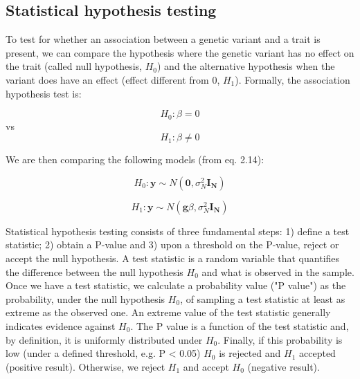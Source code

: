 
\newpage

\subsection{Statistical hypothesis testing}

To test for whether an association between a genetic variant and a trait is present, we can compare the hypothesis where the genetic variant has no effect on the trait (called null hypothesis, $H_0$) and the alternative hypothesis when the variant does have an effect (effect different from 0, $H_1$).
Formally, the association hypothesis test is:

\begin{equation}\label{eq14:null_hypothesis}
 H_{0}: \beta=0 
\end{equation}
vs
\begin{equation}\label{eq15:alternative_hypothesis}
 H_{1}: \beta \neq 0 
\end{equation}

We are then comparing the following models (from eq. 2.14):

\begin{equation}\label{eq16:null_hypothesis_regression}
 H_0: \mathbf{y} \sim N(\mathbf{0}, \sigma_N^{2} \mathbf{I_N}) 
\end{equation}

\begin{equation}\label{eq17:alternative_hypothesis_regression}
 H_1: \mathbf{y} \sim N(\mathbf{g}\beta,\sigma_N^{2} \mathbf{I_N}) 
\end{equation}

Statistical hypothesis testing consists of three fundamental steps: 1) define a test statistic; 2) obtain a P-value and 3) upon a threshold on the P-value, reject or accept the null hypothesis. 
A test statistic is a random variable that quantifies the difference between the null hypothesis $H_0$ and what is observed in the sample. 
Once we have a test statistic, we calculate a probability value ("P value") as the probability, under the null hypothesis $H_0$, of sampling a test statistic at least as extreme as the observed one. 
An extreme value of the test statistic generally indicates evidence against $H_0$.
The P value is a function of the test statistic and, by definition, it is uniformly distributed under $H_0$.
Finally, if this probability is low (under a defined threshold, e.g. P < 0.05) $H_0$ is rejected and $H_1$ accepted (positive result).
Otherwise, we reject $H_1$ and accept $H_0$ (negative result).\\

